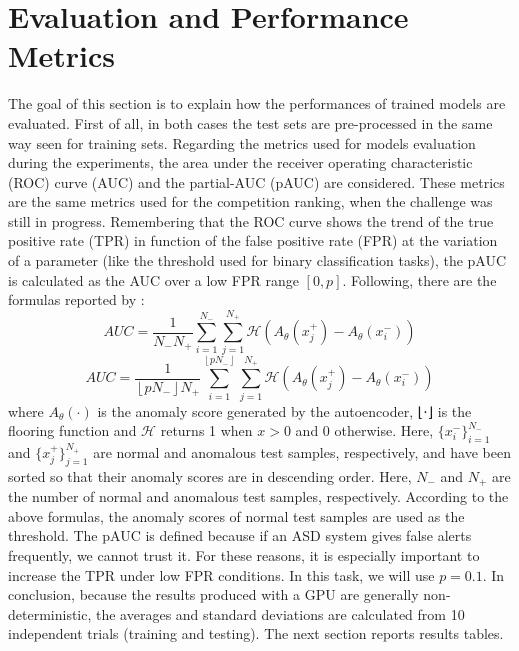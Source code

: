 \section{Evaluation and Performance Metrics}
The goal of this section is to explain how the performances of trained models are evaluated. First of all, in both cases the test sets are pre-processed in the same way seen for training sets. Regarding the metrics used for models evaluation during the experiments, the area under the receiver operating characteristic (ROC) curve (AUC) and the partial-AUC (pAUC) are considered. These metrics are the same metrics used for the competition ranking, when the challenge was still in progress. Remembering that the ROC curve shows the trend of the true positive rate (TPR) in function of the false positive rate (FPR) at the variation of a parameter (like the threshold used for binary classification tasks), the pAUC is calculated as the AUC over a low FPR range $[0,p]$. Following, there are the formulas reported by \cite{DCASE}:
\[ AUC =\frac{1}{N_-N_+}\sum_{i=1}^{N_-}\sum_{j=1}^{N_+}\mathcal{H}(A_\theta(x_j^+)-A_\theta(x_i^-)) \]
\[AUC =\frac{1}{ \left \lfloor pN_- \right \rfloor N_+}\sum_{i=1}^{ \left \lfloor pN_- \right \rfloor }\sum_{j=1}^{N_+}\mathcal{H}(A_\theta(x_j^+)-A_\theta(x_i^-))\]
where $A_\theta(\cdot)$ is the anomaly score generated by the autoencoder, ⌊⋅⌋ is the flooring function and $\mathcal{H}$ returns 1 when $x>0$ and $0$ otherwise. Here, $\{x^−_i\}^{N_-}_{i=1}$
and $\{x^+_j\}^{N_+}_{j=1}$ are normal and anomalous test samples, respectively, and have been sorted so that their anomaly scores are in descending order. Here, $N_−$ and $N_+$
are the number of normal and anomalous test samples, respectively. According to the above formulas, the anomaly scores of normal test samples are used as the threshold. The pAUC is defined because if an ASD system gives false alerts frequently, we cannot trust it. For these reasons, it is especially important to increase the TPR under low FPR conditions. In this task, we will use $p=0.1$. In conclusion, because the results produced with a GPU are generally non-deterministic, the averages and standard deviations are calculated from 10 independent trials (training and testing). The next section reports results tables.

